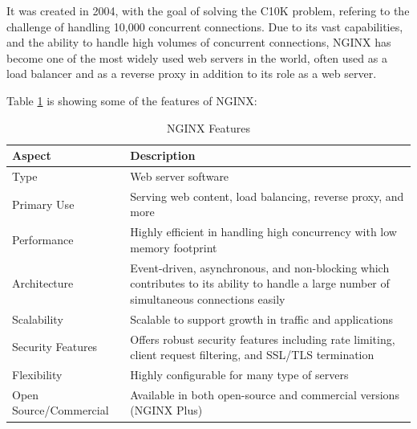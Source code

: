 It was created in 2004, with the goal of solving the C10K problem, refering to the challenge of handling 10,000 concurrent connections. \cite{nginx}
Due to its vast capabilities, and the ability to handle high volumes of concurrent connections, NGINX has become one of the most widely used web servers in the world,
often used as a load balancer and as a reverse proxy in addition to its role as a web server.

Table \ref{tab:ngnix} is showing some of the features of NGINX\cite{nginx}:

\begin{table}[H]
    \centering
    \begin{tabularx}{\textwidth}{|l|X|}
        \hline
        \textbf{Aspect}        & \textbf{Description}                                                                                                                      \\
        \hline
        Type                   & Web server software                                                                                                                       \\
        \hline
        Primary Use            & Serving web content, load balancing, reverse proxy, and more                                                                              \\
        \hline
        Performance            & Highly efficient in handling high concurrency with low memory footprint                                                                   \\
        \hline
        Architecture           & Event-driven, asynchronous, and non-blocking which contributes to its ability to handle a large number of simultaneous connections easily \\
        \hline
        Scalability            & Scalable to support growth in traffic and applications                                                                                    \\
        \hline
        Security Features      & Offers robust security features including rate limiting, client request filtering, and SSL/TLS termination                                \\
        \hline
        Flexibility            & Highly configurable for many type of servers                                                                       \\
        \hline
        Open Source/Commercial & Available in both open-source and commercial versions (NGINX Plus)                                                                        \\
        \hline
    \end{tabularx}
    \label{tab:ngnix}
    \caption{NGINX Features}
\end{table}

